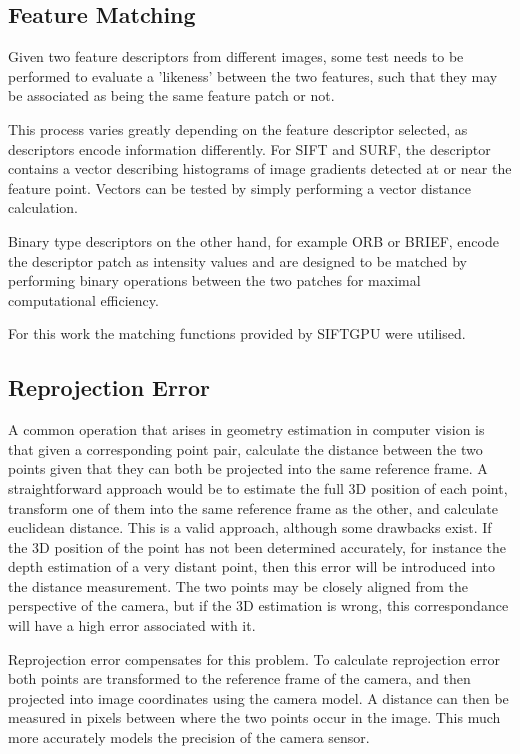 \subsection{Feature Matching}

Given two feature descriptors from different images, some test needs to be performed to evaluate a 'likeness' between the two features, such that they may be associated as being the same feature patch or not.

This process varies greatly depending on the feature descriptor selected, as descriptors encode information differently.  For SIFT and SURF, the descriptor contains a vector describing histograms of image gradients detected at or near the feature point.  Vectors can be tested by simply performing a vector distance calculation.

Binary type descriptors on the other hand, for example ORB or BRIEF, encode the descriptor patch as intensity values and are designed to be matched by performing binary operations between the two patches for maximal computational efficiency.

For this work the matching functions provided by SIFTGPU were utilised.

\subsection{Reprojection Error}
\label{subsec:reprojection_error}

A common operation that arises in geometry estimation in computer vision is that given a corresponding point pair, calculate the distance between the two points given that they can both be projected into the same reference frame.  A straightforward approach would be to estimate the full 3D position of each point, transform one of them into the same reference frame as the other, and calculate euclidean distance.  This is a valid approach, although some drawbacks exist.  If the 3D position of the point has not been determined accurately, for instance the depth estimation of a very distant point, then this error will be introduced into the distance measurement.  The two points may be closely aligned from the perspective of the camera, but if the 3D estimation is wrong, this correspondance will have a high error associated with it.

Reprojection error compensates for this problem.  To calculate reprojection error both points are transformed to the reference frame of the camera, and then projected into image coordinates using the camera model.  A distance can then be measured in pixels between where the two points occur in the image.  This much more accurately models the precision of the camera sensor.

